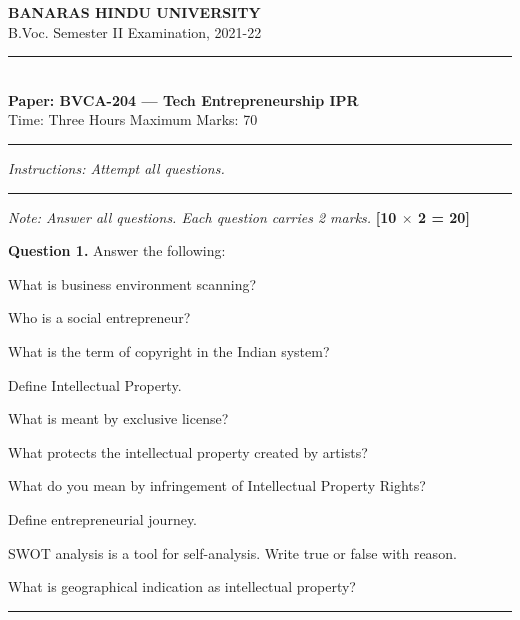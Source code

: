 \documentclass[11pt,a4paper]{article}
\begin{document}
\begin{center}
  {\large\bfseries BANARAS HINDU UNIVERSITY}\\[2pt]
  {
\normalsize B.Voc. Semester II Examination, 2021-22}\\[6pt]
  \rule{0.8\linewidth}{0.5pt}\\[6pt]
  {\large\bfseries Paper: BVCA-204 --- Tech Entrepreneurship IPR}\\[4pt]
  {
\normalsize Time: Three Hours \hfill Maximum Marks: 70}
\end{center}

\rule{\linewidth}{0.4pt}

\smallskip
\smallskip



\noindent   \textit{Instructions: Attempt all questions.}

\bigskip

\bigskip


\rule{\linewidth}{0.4pt}\smallskip




\noindent   \textit{Note: Answer all questions. Each question carries 2 marks.} \hfill   \textbf{[10 $ \times$ 2 = 20]}

\medskip


\noindent   \textbf{Question 1.} Answer the following:

\begin{parts}
  \item What is business environment scanning?
  \item Who is a social entrepreneur?
  \item What is the term of copyright in the Indian system?
  \item Define Intellectual Property.
  \item What is meant by exclusive license?
  \item What protects the intellectual property created by artists?
  \item What do you mean by infringement of Intellectual Property Rights?
  \item Define entrepreneurial journey.
  \item SWOT analysis is a tool for self-analysis. Write true or false with reason.
  \item What is geographical indication as intellectual property?
\end{parts}

\bigskip


\rule{\linewidth}{0.4pt}\smallskip
\end{document}
